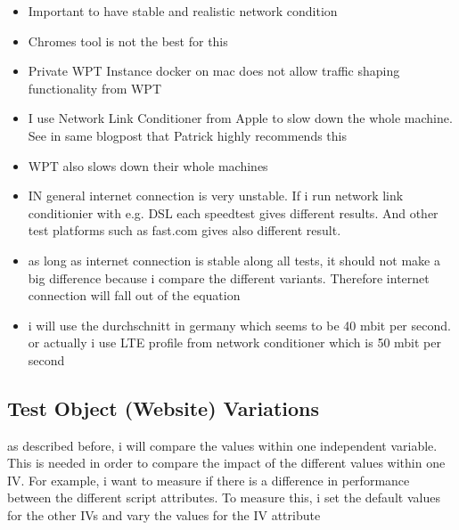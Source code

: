 \begin{itemize}
\item Important to have stable and realistic network condition
\item Chromes tool is not the best for this %
\item Private WPT Instance docker on mac does not allow traffic shaping functionality from WPT
\item I use Network Link Conditioner from Apple to slow down the whole machine. See in same blogpost that Patrick highly recommends this
\item WPT also slows down their whole machines %
\item IN general internet connection is very unstable. If i run network link conditionier with e.g. DSL each speedtest gives different results. And other test platforms such as fast.com gives also different result.
\item as long as internet connection is stable along all tests, it should not make a big difference because i compare the different variants. Therefore internet connection will fall out of the equation
\item i will use the durchschnitt in germany which seems to be 40 mbit per second. or actually i use LTE profile from network conditioner which is 50 mbit per second 
\end{itemize}









\subsection{Test Object (Website) Variations}

as described before, i will compare the values within one independent variable. 
This is needed in order to compare the impact of the different values within one IV.
For example, i want to measure if there is a difference in performance between the different script attributes. To measure this, i set the default values for the other IVs and vary the values for the IV attribute

